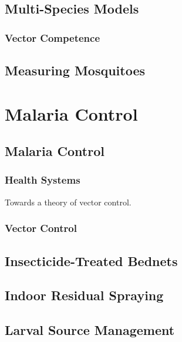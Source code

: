 \documentclass[
]{book}
\begin{document}
\chapter{Multi-Species Models}\label{multi-species-models}

\section{Vector Competence}\label{vector-competence}

\chapter{Measuring Mosquitoes}\label{measuring-mosquitoes}

\part{Malaria Control}\label{part-malaria-control}

\chapter{Malaria Control}\label{malaria-control}

\section{Health Systems}\label{health-systems}

Towards a theory of vector control.

\section{Vector Control}\label{vector-control}

\chapter{Insecticide-Treated Bednets}\label{insecticide-treated-bednets}

\chapter{Indoor Residual Spraying}\label{indoor-residual-spraying}

\chapter{Larval Source Management}\label{larval-source-management-1}
\end{document}
